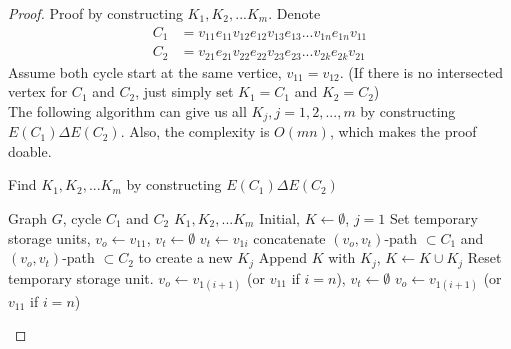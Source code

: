                     \begin{proof}
                        Proof by constructing $K_1, K_2, ... K_m$. Denote 
                        \begin{align*}
                            C_1 & = v_{11}e_{11}v_{12}e_{12}v_{13}e_{13}...v_{1n}e_{1n}v_{11}\\
                            C_2 & = v_{21}e_{21}v_{22}e_{22}v_{23}e_{23}...v_{2k}e_{2k}v_{21}
                        \end{align*}
                        Assume both cycle start at the same vertice, $v_{11} = v_{12}$. (If there is no intersected vertex for $C_1$ and $C_2$, just simply set $K_1 = C_1$ and $K_2 = C_2$)\\
                        The following algorithm can give us all $K_j, j=1, 2, ... , m$ by constructing $E(C_1)\Delta E(C_2)$.  Also, the complexity is $O(mn)$, which makes the proof doable.\\
                        \begin{algorithm}[H]
                            \caption{Find $K_1, K_2, ... K_m$ by constructing $E(C_1)\Delta E(C_2)$}
                            \begin{algorithmic}[1]
                                \Require Graph $G$, cycle $C_1$ and $C_2$
                                \Ensure $K_1, K_2, ... K_m$
                                \State Initial, $K \gets \emptyset$, $j = 1$
                                \State Set temporary storage units, $v_o \gets v_{11}$, $v_t \gets \emptyset$
                                            \State $v_t \gets v_{1i}$
                                            \State concatenate $(v_o, v_t)$-path $\subset C_1$ and $(v_o, v_t)$-path $\subset C_2$ to create a new $K_j$
                                            \State Append $K$ with $K_j$, $K \gets K \cup K_j$
                                            \State Reset temporary storage unit. $v_o \gets v_{1(i+1)}$ (or $v_{11}$ if $i = n$), $v_t \gets \emptyset$
                                        \Else
                                            \State $v_o \gets v_{1(i+1)}$ (or $v_{11}$ if $i = n$)
                                        \EndIf
                                    \EndIf
                                \EndFor
                            \end{algorithmic}

\end{algorithm}
\end{proof}
